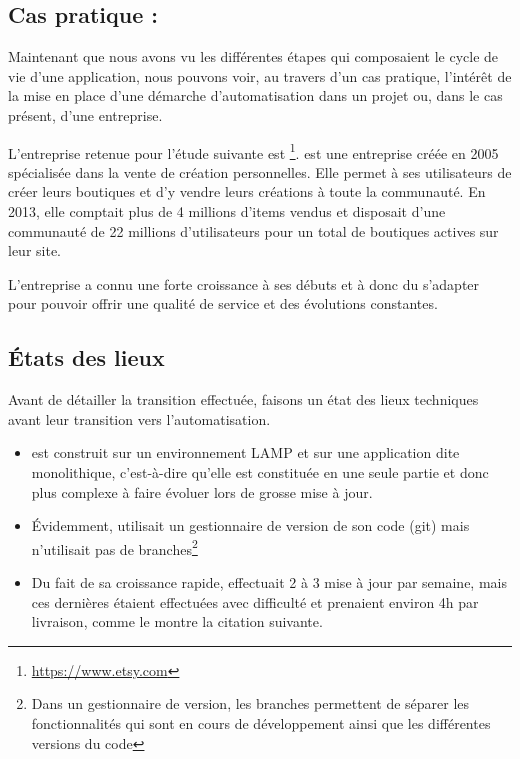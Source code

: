 \subsection{Cas pratique : \etsy}

Maintenant que nous avons vu les différentes étapes qui composaient le cycle de vie d'une application, nous pouvons voir, au travers d'un cas pratique, l'intérêt de la mise en place d'une démarche d'automatisation dans un projet ou, dans le cas présent, d'une entreprise.


L'entreprise retenue pour l'étude suivante est \etsy\footnote{\url{https://www.etsy.com}}. \etsy{} est une entreprise créée en 2005 spécialisée dans la vente de création personnelles. Elle permet à ses utilisateurs de créer leurs boutiques et d'y vendre leurs créations à toute la communauté. En 2013, elle comptait plus de 4 millions d'items vendus et disposait d'une communauté de 22 millions d'utilisateurs pour un total de  boutiques actives sur leur site.

L'entreprise a connu une forte croissance à ses débuts et à donc du s'adapter pour pouvoir offrir une qualité de service et des évolutions constantes.

\subsection{États des lieux}

Avant de détailler la transition effectuée, faisons un état des lieux techniques avant leur transition vers l'automatisation.

\begin{itemize}
	\item \etsy{} est construit sur un environnement \gls{LAMP} et sur une application dite monolithique, c'est-à-dire qu'elle est constituée en une seule partie et donc plus complexe à faire évoluer lors de grosse mise à jour.
	\item Évidemment, \etsy{} utilisait un gestionnaire de version de son code (\gls{git}) mais n'utilisait pas de branches\footnote{Dans un gestionnaire de version, les branches permettent de séparer les fonctionnalités qui sont en cours de développement ainsi que les différentes versions du code}
	\item Du fait de sa croissance rapide, \etsy{} effectuait 2 à 3 mise à jour par semaine, mais ces dernières étaient effectuées avec difficulté et prenaient environ 4h par livraison, comme le montre la citation suivante. 
\end{itemize}

